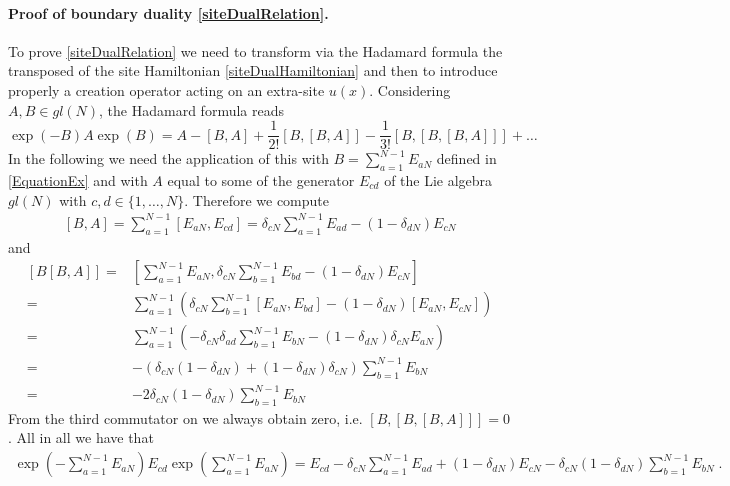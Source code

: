 \documentclass[10pt]{article}
\numberwithin{equation}{section}
\numberwithin{equation}{subsection}
\newcommand{\dt}{\;.}
\begin{document}
 \paragraph{Proof of boundary duality \eqref{siteDualRelation}.} To prove \eqref{siteDualRelation} we need to transform via the Hadamard formula the transposed of the site Hamiltonian \eqref{siteDualHamiltonian} and then to  introduce properly a creation operator acting on an extra-site $u(x)$. %
 Considering $A,B\in gl(N)$, the Hadamard formula reads 
 \begin{equation}\label{HadamardFormula}
     \exp{(-B)}A\exp{(B)}=A-\left[B,A\right]+\frac{1}{2!}\left[B,\left[B,A\right]\right]-\frac{1}{3!}\left[B,\left[B,\left[B,A\right]\right]\right]+\ldots
 \end{equation}
In the following we need the application of this with $B=\sum_{a=1}^{N-1}E_{aN}$ defined in \eqref{EquationEx} and with $A$ equal to some of the generator $E_{cd}$ of the Lie algebra $gl(N)$ with $c,d\in\{1,\ldots,N\}$. Therefore we compute 
\begin{align}
	\left[B,A\right]=\sum_{a=1}^{N-1}\left[E_{aN},E_{cd}\right]=\delta_{cN}\sum_{a=1}^{N-1}E_{ad}-(1-\delta_{dN})E_{cN}
\end{align}
and 
\begin{align}
	\left[B\left[B,A\right]\right]=&\left[\sum_{a=1}^{N-1}E_{aN},\delta_{cN}\sum_{b=1}^{N-1}E_{bd}-(1-\delta_{dN})E_{cN}\right]\nonumber\\=&
	\sum_{a=1}^{N-1}\left(\delta_{cN}\sum_{b=1}^{N-1}\left[E_{aN},E_{bd}\right]-(1-\delta_{dN})\left[E_{aN},E_{cN}\right]\right)\nonumber\\=&
	\sum_{a=1}^{N-1}\left(-\delta_{cN}\delta_{ad}\sum_{b=1}^{N-1}E_{bN}-(1-\delta_{dN})\delta_{cN}E_{aN}\right)\nonumber\\=&
	-\left(\delta_{cN}(1-\delta_{dN})+(1-\delta_{dN})\delta_{cN}\right)\sum_{b=1}^{N-1}E_{bN}\nonumber
	\\=&
	-2\delta_{cN}(1-\delta_{dN})\sum_{b=1}^{N-1}E_{bN}
\end{align}
From the third commutator on we always obtain zero, i.e. $[B,[B,[B,A]]]=0$. All in all we have that 
 \begin{align}\label{HT-BA}
 	\exp{\left(-\sum_{a=1}^{N-1}E_{aN}\right)}E_{cd}\exp{\left(\sum_{a=1}^{N-1}E_{aN}\right)}=E_{cd}-\delta_{cN}\sum_{a=1}^{N-1}E_{ad}+(1-\delta_{dN})E_{cN}-\delta_{cN}(1-\delta_{dN})\sum_{b=1}^{N-1}E_{bN}\dt
 \end{align}
\end{document}
